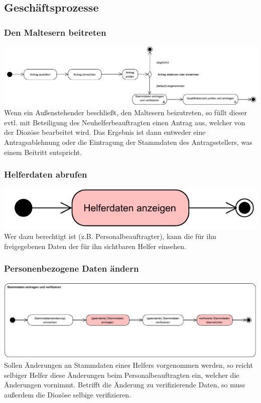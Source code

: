 \documentclass{beamer}
\begin{document}
\subsection{Geschäftsprozesse}		
\begin{frame}
\frametitle{Den Maltesern beitreten}
\includegraphics[width=\textwidth]{PDF/BusinessP/Mitglied_werden.pdf}
Wenn ein Außenstehender beschließt, den Maltesern beizutreten, so füllt dieser evtl. mit Beteiligung des Neuhelferbeauftragten einen Antrag aus, welcher von der Diozöse bearbeitet wird. Das Ergebnis ist dann entweder eine Antragsablehnung oder die Eintragung der Stammdaten des Antragsstellers, was einem Beitritt entspricht. 
\end{frame}
\begin{frame}
\frametitle{Helferdaten abrufen}
\includegraphics[width=\textwidth]{PDF/BusinessP/Daten_abrufen.pdf}
Wer dazu berechtigt ist (z.B. Personalbeauftragter), kann die für ihn freigegebenen Daten der für ihn sichtbaren Helfer einsehen.
\end{frame}

\begin{frame}
\frametitle{Personenbezogene Daten ändern}
\includegraphics[width=\textwidth]{PDF/BusinessP/Daten_aendern.pdf}
Sollen Änderungen an Stammdaten eines Helfers vorgenommen werden, so reicht selbiger Helfer diese Änderungen beim Personalbeauftragten ein, welcher die Änderungen vornimmt. Betrifft die Änderung zu verifizierende Daten, so muss außerdem die Diozöse selbige verifizieren.
\end{frame}
\end{document}
